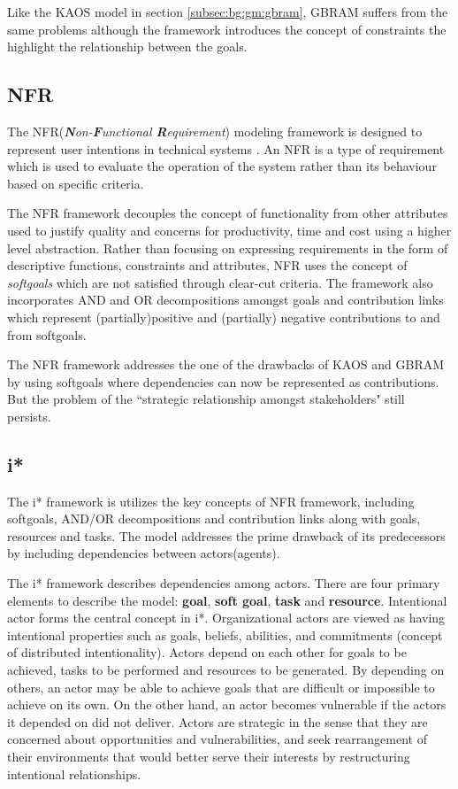 Like the KAOS model in section \ref{subsec:bg:gm:gbram}, GBRAM suffers from the same problems although the framework introduces the concept of constraints the highlight the relationship between the goals.

\subsection{NFR}
\label{subsec:bg:gm:nfr}

The NFR(\textit{\textbf{N}on-\textbf{F}unctional \textbf{R}equirement}) modeling framework is designed to represent user intentions in technical systems \cite{chung00}. 
An NFR is a type of requirement which is used to evaluate the operation of the system rather than its behaviour based on specific criteria.

The NFR framework decouples the concept  of functionality from other attributes used to justify quality and concerns for productivity, time and cost using a higher level abstraction. Rather than focusing on expressing requirements in the form of descriptive functions, constraints and attributes, NFR uses the concept of \textit{softgoals} which are not satisfied through clear-cut criteria. The framework also incorporates AND and OR decompositions amongst goals and contribution links which represent (partially)positive and (partially) negative contributions to and from softgoals.

The NFR framework addresses the one of the drawbacks of KAOS and GBRAM by using softgoals where dependencies can now be represented as contributions. But the problem of the ``strategic relationship amongst stakeholders" still persists.

\subsection{i*}
\label{subsec:bg:gm:istar}
The i* framework \cite{yu97} is utilizes the key concepts of NFR framework, including softgoals, AND/OR decompositions and contribution links along with goals, resources and tasks. The model addresses the prime drawback of its predecessors by including dependencies between actors(agents).

The i* framework describes dependencies among actors. There are four primary elements to describe the model: \textbf{goal}, \textbf{soft goal}, \textbf{task} and \textbf{resource}. Intentional actor forms the central concept in i*. Organizational actors are viewed as having intentional properties such as goals, beliefs, abilities, and commitments (concept of distributed intentionality). Actors depend on each other for goals to be achieved, tasks to be performed and resources to be generated. By depending on others, an actor may be able to achieve goals that are difficult or impossible to achieve on its own. On the other hand, an actor becomes vulnerable if the actors it depended on did not deliver. Actors are strategic in the sense that they are concerned about opportunities and vulnerabilities, and seek rearrangement of their environments that would better serve their interests by restructuring intentional relationships.

